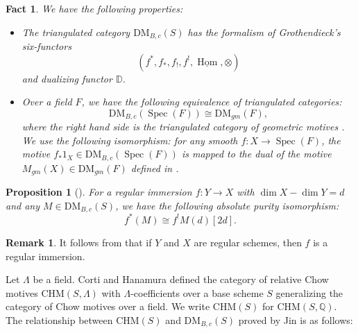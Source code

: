 \documentclass[11pt, a4paper]{amsart}
\theoremstyle{plain}
\newtheorem{proposition}[theorem]{Proposition}
\newtheorem{fact}[theorem]{Fact}
\theoremstyle{definition}
\newtheorem{remark}[theorem]{Remark}
\numberwithin{equation}{section}
\def\QQ{\mathbb{Q}}
\DeclareMathOperator{\Hom}{Hom}
\DeclareMathOperator{\Spec}{Spec}
\begin{document}
\begin{fact}
We have the following properties: 
 \begin{itemize}
     \item \textnormal{\cite[Theorem 15.2.4]{Cisinski_Deglise}} The triangulated category $\mathrm{DM}_{B,c}(S)$ has the formalism of Grothendieck's six-functors 
     \begin{equation*}
        (f^{*}, f_{*}, f_{!}, f^{!},\underline{\Hom}, \otimes)
    \end{equation*}
     and dualizing functor $\mathbb{D}$. 
     \item \textnormal{\cite[Remark 11.1.14]{Cisinski_Deglise}} Over a field $F$, we have the following equivalence of triangulated categories: 
           \begin{equation}
           \label{eq: isomorphism Beilinson motive to geometric motive}
               \mathrm{DM}_{B,c}(\Spec (F)) \cong \mathrm{DM}_{gm}(F), 
           \end{equation}
           where the right hand side is the triangulated category of geometric motives \textnormal{\cite[Definition 2.1.1, Page 5]{V00}}. We use the following isomorphism: for any smooth $f \colon X \rightarrow \Spec (F)$, the motive $f_{*}1_{X} \in \mathrm{DM}_{B,c}(\Spec (F))$ is mapped to the dual of the motive $M_{gm}(X) \in \mathrm{DM}_{gm}(F)$ defined in \textnormal{\cite[Definition 2.1.1]{V00}}.
\end{itemize}
 \end{fact}

 \begin{proposition}[{\cite[Proposition 1.7]{PL15}}]
       For a regular immersion $f \colon Y \rightarrow X$ with $\dim X - \dim Y = d$ and any $M \in \mathrm{DM}_{B,c}(S)$, we have the following absolute purity isomorphism: 
       \begin{equation*}
           f^{*}(M) \cong f^{!}M(d)[2d]. 
       \end{equation*}
 \end{proposition}

 \begin{remark}
     It follows from \cite[\href{https://stacks.math.columbia.edu/tag/0E9J}{Tag 0E9J}]{stacks-project} that if $Y$ and $X$ are regular schemes, then $f$ is a regular immersion.
 \end{remark}

 \par Let $\Lambda$ be a field. Corti and Hanamura \cite[Definition 2.9]{Corti-Hanamura00}  defined the category of relative Chow motives $\mathrm{CHM}(S, \Lambda)$ with $\Lambda$-coefficients over a base scheme $S$ generalizing the category of Chow motives over a field. We write $\mathrm{CHM}(S)$ for $\mathrm{CHM}(S, \QQ)$. The relationship between $\mathrm{CHM}(S)$ and $\mathrm{DM}_{B,c}(S)$ proved by Jin is as follows: 
 
\end{document}
